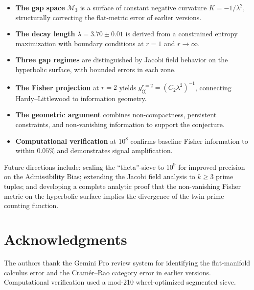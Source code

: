 \documentclass[12pt]{article}
\begin{document}
\begin{itemize}
  \item \textbf{The gap space} $\mathcal{M}_3$ is a surface of constant negative
    curvature $K = -1/\lambda^2$, structurally correcting the flat-metric error
    of earlier versions.
  \item \textbf{The decay length} $\lambda = 3.70 \pm 0.01$ is derived from a
    constrained entropy maximization with boundary conditions at $r=1$ and
    $r \to \infty$.
  \item \textbf{Three gap regimes} are distinguished by Jacobi field behavior
    on the hyperbolic surface, with bounded errors in each zone.
  \item \textbf{The Fisher projection} at $r=2$ yields $g_{\xi\xi}^{r=2} =
    (C_2\lambda^2)^{-1}$, connecting Hardy--Littlewood to information geometry.
  \item \textbf{The geometric argument} combines non-compactness, persistent
    constraints, and non-vanishing information to support the conjecture.
  \item \textbf{Computational verification} at $10^8$ confirms baseline Fisher
    information to within $0.05\%$ and demonstrates signal amplification.
\end{itemize}

Future directions include: scaling the ``theta''-sieve to $10^9$ for improved
precision on the Admissibility Bias; extending the Jacobi field analysis to
$k \geq 3$ prime tuples; and developing a complete analytic proof that the
non-vanishing Fisher metric on the hyperbolic surface implies the divergence
of the twin prime counting function.

\section*{Acknowledgments}

The authors thank the Gemini Pro review system for identifying the flat-manifold
calculus error and the Cram\'er--Rao category error in earlier versions.
Computational verification used a mod-210 wheel-optimized segmented sieve.
\end{document}
